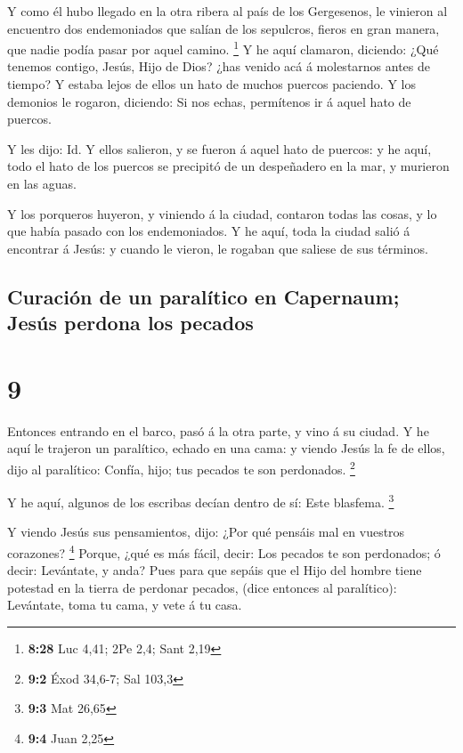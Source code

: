  Y como él hubo llegado en la otra ribera al país de los
Gergesenos, le vinieron al encuentro dos endemoniados que salían de los
sepulcros, fieros en gran manera, que nadie podía pasar por aquel
camino. \footnote{\textbf{8:28} Luc 4,41; 2Pe 2,4; Sant 2,19}
 Y he aquí clamaron, diciendo: ¿Qué tenemos contigo,
Jesús, Hijo de Dios? ¿has venido acá á molestarnos antes de tiempo?
 Y estaba lejos de ellos un hato de muchos puercos
paciendo.  Y los demonios le rogaron, diciendo: Si nos
echas, permítenos ir á aquel hato de puercos.

 Y les dijo: Id. Y ellos salieron, y se fueron á aquel
hato de puercos: y he aquí, todo el hato de los puercos se precipitó de
un despeñadero en la mar, y murieron en las aguas.

 Y los porqueros huyeron, y viniendo á la ciudad,
contaron todas las cosas, y lo que había pasado con los endemoniados.
 Y he aquí, toda la ciudad salió á encontrar á Jesús: y
cuando le vieron, le rogaban que saliese de sus términos.

\hypertarget{curaciuxf3n-de-un-paraluxedtico-en-capernaum-jesuxfas-perdona-los-pecados}{%
\subsection{Curación de un paralítico en Capernaum; Jesús perdona los
pecados}\label{curaciuxf3n-de-un-paraluxedtico-en-capernaum-jesuxfas-perdona-los-pecados}}

\hypertarget{section-8}{%
\section{9}\label{section-8}}

 Entonces entrando en el barco, pasó á la otra parte, y
vino á su ciudad.  Y he aquí le trajeron un paralítico,
echado en una cama: y viendo Jesús la fe de ellos, dijo al paralítico:
Confía, hijo; tus pecados te son perdonados. \footnote{\textbf{9:2} Éxod
  34,6-7; Sal 103,3}

 Y he aquí, algunos de los escribas decían dentro de sí:
Este blasfema. \footnote{\textbf{9:3} Mat 26,65}

 Y viendo Jesús sus pensamientos, dijo: ¿Por qué pensáis
mal en vuestros corazones? \footnote{\textbf{9:4} Juan 2,25}
 Porque, ¿qué es más fácil, decir: Los pecados te son
perdonados; ó decir: Levántate, y anda?  Pues para que
sepáis que el Hijo del hombre tiene potestad en la tierra de perdonar
pecados, (dice entonces al paralítico): Levántate, toma tu cama, y vete
á tu casa.


